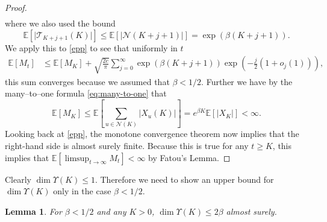 \documentclass{article}
\newtheorem{lem}[thm]{Lemma}
\theoremstyle{definition}
\newtheorem{remark}[thm]{Remark}
\numberwithin{equation}{section}
\numberwithin{thm}{section}
\newcommand*{\NN}{\ensuremath{\mathbb{N}}}		        %
\newcommand*{\EE}{\ensuremath{\mathbb{E}}}	        	%
\newcommand*{\diam}{\ensuremath{\mathrm{diam} \ }}	        %
\begin{document}
\begin{proof}
\begin{align}
    \end{align}
    where we also used the bound 
    $$\EE\left[\vert \mathcal{T}_{K+j+1}(K)\vert \right]\leq \EE\left[\vert \mathcal{N}(K+j+1)\vert \right]=\exp\left(\beta(K+j +1)\right).$$
    We apply this to \eqref{epp} to see that uniformly in $t$
    \begin{align*}
        \EE [M_t]&\leq \EE [M_K]+\sqrt{\frac{2c}{\pi}}\sum_{j=0}^\infty \exp\left(\beta(K+j +1)\right) \exp\left(-\frac{j}{2}(1+o_j(1))\right),
    \end{align*}
    this sum converges because we assumed that $\beta<1/2$. 
    Further we have by the many--to--one formula \eqref{eq:many-to-one} that
    \begin{equation*}
        \EE [M_K] \leq \EE\left[ \sum_{u\in \mathcal{N}(K)}\vert X_u(K)\vert\right]=e^{\beta K} \EE[{\vert X_K \vert}] <\infty.
    \end{equation*}
    Looking back at \eqref{epp}, the monotone convergence theorem now implies that the right-hand side is almost surely finite. Because this is true for any $t\geq K$, this implies that $\EE[\limsup_{t \to \infty} M_t]<\infty$ by Fatou's Lemma.
\end{proof}


Clearly $\dim \Upsilon(K)\leq 1$. Therefore we need to show an upper bound for $\dim \Upsilon(K)$ only in the case $\beta<1/2$.

\begin{lem}\label{lemma:upper_bound_simplified}
    For $\beta <1/2$ and any $K>0$, $\dim \Upsilon(K) \leq 2\beta$ almost surely. 
\end{lem}
\end{document}

